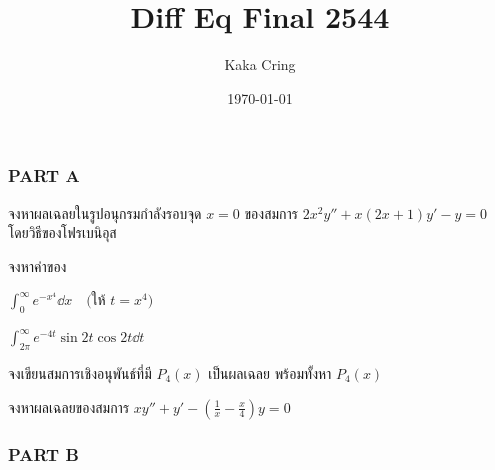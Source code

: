\documentclass[12pt,final]{novelette} %
\title{Diff Eq Final 2544}
\author{Kaka Cring}
\date{\today}
\begin{document}

\subsubsection*{PART A}

\begin{question}
    \item {}
    จงหาผลเฉลยในรูปอนุกรมกำลังรอบจุด $x=0$ ของสมการ $2x^2y'' + x(2x+1)y' - y = 0$ โดยวิธีของโฟรเบนิอุส 



    \item {}
    จงหาค่าของ
    \begin{question}
        \item
        $\displaystyle \int_0^\infty e^{-x^4} \dd{x} \quad \text{(ให้ $t = x^4$)}$ 



        \item
        $\displaystyle \int_{2\pi}^\infty e^{-4t} \sin 2t \cos 2t \dd{t}$ 



    \end{question}

    \item {}
    จงเขียนสมการเชิงอนุพันธ์ที่มี $P_4(x)$ เป็นผลเฉลย พร้อมทั้งหา $P_4(x)$ 



    \item {}
    จงหาผลเฉลยของสมการ $\displaystyle xy'' + y' - \left(\frac1x - \frac x4\right)y = 0$ 



\end{question}

\subsubsection*{PART B}
\end{document}
